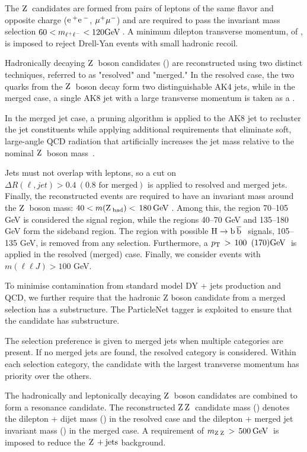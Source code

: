 The $\mathrm{Z}\hspace{0.2em}$ candidates are formed from pairs of leptons of the same flavor and opposite charge ($\mathrm{e}\hspace{0.2em}^{+}\mathrm{e}\hspace{0.2em}^{-}$, ${\mu}^{+}{\mu}^{-}$) and are required to pass the invariant mass selection $60 < m_{\ell^+\ell^-} < 120\mathrm{GeV}\hspace{0.2em}$.
A minimum dilepton transverse momentum, \PT{} of \unit{\DILEPTONPTCUT}{\GeV}, is imposed to reject Drell-Yan events with small hadronic recoil.

Hadronically decaying $\mathrm{Z}\hspace{0.2em}$ boson candidates (\Zhad) are reconstructed using two distinct techniques, referred to as "resolved" and "merged."
In the resolved case, the two quarks from the $\mathrm{Z}\hspace{0.2em}$ boson decay form two distinguishable AK4 jets, while in the merged case, a single AK8 jet with a large transverse momentum is taken as a \Zhad.

In the merged jet case, a pruning algorithm is applied to the AK8 jet to recluster the jet constituents while applying additional requirements that eliminate soft, large-angle QCD radiation that artificially increases the jet mass relative to the nominal $\mathrm{Z}\hspace{0.2em}$ boson mass~\cite{prune,substructure}.

Jets must not overlap with leptons, so a cut on $\Delta R(\ell, jet) > 0.4~(0.8\textrm{~for merged})$ is applied to resolved and merged jets.
Finally, the reconstructed events are required to have an invariant mass around the $\mathrm{Z}\hspace{0.2em}$ boson mass: $40 < m(\mathrm{Z}\hspace{0.2em}_\textrm{had}) < \text{\,180}\hspace{0.2em}{\ensuremath{\mathrm{GeV}}\hspace{0.2em}}$.
Among this, the region 70--105 GeV is considered the signal region, while the regions 40--70 GeV and 135--180 GeV form the sideband region.
The region with possible $\Ho \to \bbbar$ signals, 105--135 GeV, is removed from any selection.
Furthermore, a $\PT > \unit{\VHADRESOLVEDPTCUT}\ (\VHADMERGEDPTCUT) {\GeV}$ is applied in the resolved (merged) case.
Finally, we consider events with $m(\ell\ell J) > 100$ GeV.%

To minimise contamination from standard model DY + jets production and QCD, we further require that the hadronic Z boson candidate from a merged selection has a substructure.
The ParticleNet tagger is exploited to ensure that the candidate has substructure.

The selection preference is given to merged jets when multiple categories are present. If no merged jets are found, the resolved category is considered.
Within each selection category, the candidate with the largest transverse momentum has priority over the others.

The hadronically and leptonically decaying $\mathrm{Z}\hspace{0.2em}$ boson candidates are combined to form a resonance candidate.
The reconstructed $\mathrm{Z}\hspace{0.2em}\mathrm{Z}\hspace{0.2em}$ candidate mass (\mZZ{}) denotes the dilepton + dijet mass (\mlljj{}) in the resolved case and the dilepton + merged jet invariant mass (\mllJ{}) in the merged case.
A requirement of $m_{\mathrm{Z}\hspace{0.2em}\mathrm{Z}\hspace{0.2em}}{}> \text{\,500}\hspace{0.2em}{\ensuremath{\mathrm{GeV}}\hspace{0.2em}}$ is imposed to reduce the $\mathrm{Z}\hspace{0.2em} + \text{jets}$ background.%

